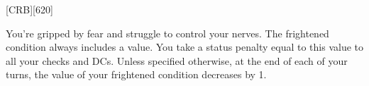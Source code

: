 
[CRB][620]

You're gripped by fear and struggle to control your nerves.
The frightened condition always includes a value.
You take a status penalty equal to this value to all your checks and DCs.
Unless specified otherwise, at the end of each of your turns, the value of your frightened condition decreases by 1.
